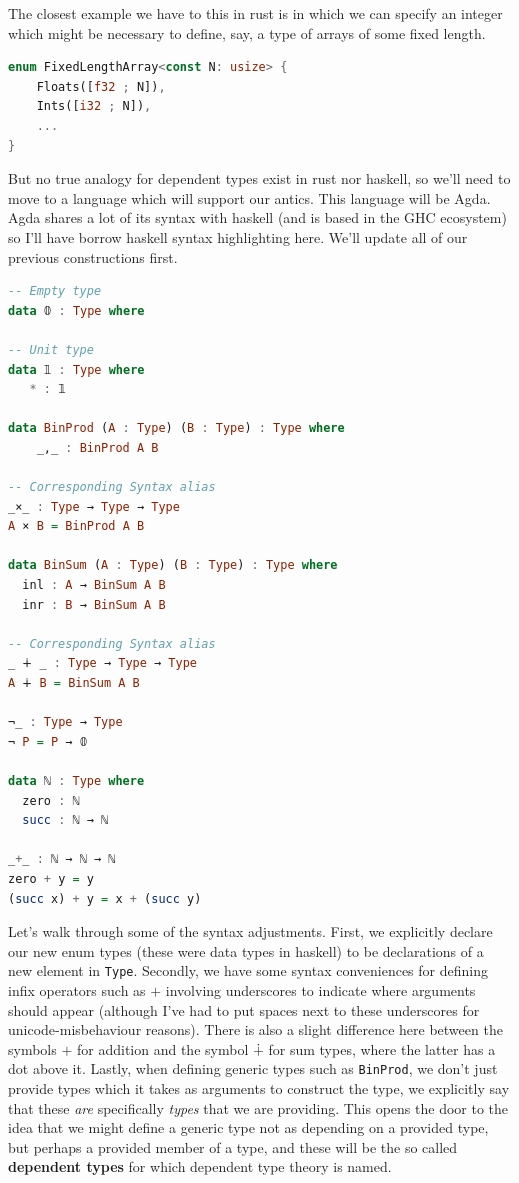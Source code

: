 \documentclass[11pt]{article}
\begin{document}
The closest example we have to this in rust is  in which we can specify an integer which might be necessary to define, say, a type of arrays of some fixed length. \begin{lstlisting}[language=Rust]
enum FixedLengthArray<const N: usize> {
	Floats([f32 ; N]),
	Ints([i32 ; N]),
	...
}
\end{lstlisting}

But no true analogy for dependent types exist in rust nor haskell, so we'll need to move to a language which will support our antics. This language will be Agda. Agda shares a lot of its syntax with haskell (and is based in the GHC ecosystem) so I'll have borrow haskell syntax highlighting here. We'll update all of our previous constructions first. \begin{lstlisting}[language=Haskell]
-- Empty type
data 𝟘 : Type where

-- Unit type
data 𝟙 : Type where
   * : 𝟙 

data BinProd (A : Type) (B : Type) : Type where
    _,_ : BinProd A B

-- Corresponding Syntax alias
_×_ : Type → Type → Type
A × B = BinProd A B

data BinSum (A : Type) (B : Type) : Type where
  inl : A → BinSum A B
  inr : B → BinSum A B
    
-- Corresponding Syntax alias
_ ∔ _ : Type → Type → Type
A ∔ B = BinSum A B

¬_ : Type → Type
¬ P = P → 𝟘

data ℕ : Type where
  zero : ℕ
  succ : ℕ → ℕ

_+_ : ℕ → ℕ → ℕ
zero + y = y
(succ x) + y = x + (succ y)
\end{lstlisting}

Let's walk through some of the syntax adjustments. First, we explicitly declare our new enum types (these were data types in haskell) to be declarations of a new element in \texttt{Type}. Secondly, we have some syntax conveniences for defining infix operators such as $+$ involving underscores to indicate where arguments should appear (although I've had to put spaces next to these underscores for unicode-misbehaviour reasons). There is also a slight difference here between the symbols $+$ for addition and the symbol $\dotplus$ for sum types, where the latter has a dot above it. Lastly, when defining generic types such as \texttt{BinProd}, we don't just provide types which it takes as arguments to construct the type, we explicitly say that these \emph{are} specifically \emph{types} that we are providing. This opens the door to the idea that we might define a generic type not as depending on a provided type, but perhaps a provided member of a type, and these will be the so called \textbf{dependent types} for which dependent type theory is named.
\end{document}
